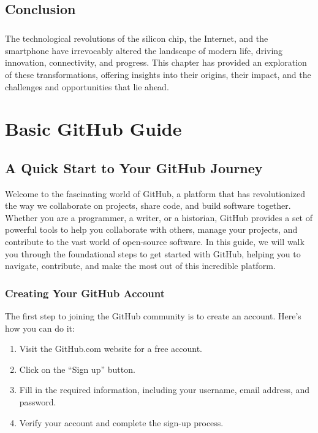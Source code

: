 \documentclass{book}
\begin{document}
\section*{Conclusion}
\paragraph{}
The technological revolutions of the silicon chip, the Internet, and the smartphone have irrevocably altered the landscape of modern life, driving innovation, connectivity, and progress. This chapter has provided an exploration of these transformations, offering insights into their origins, their impact, and the challenges and opportunities that lie ahead.



\clearpage
{}
\appendix
\renewcommand{\thechapter}{\Roman{chapter}} %

\chapter{Basic GitHub Guide}
\section*{A Quick Start to Your GitHub Journey}

Welcome to the fascinating world of GitHub, a platform that has revolutionized the way we collaborate on projects, share code, and build software together. Whether you are a programmer, a writer, or a historian, GitHub provides a set of powerful tools to help you collaborate with others, manage your projects, and contribute to the vast world of open-source software. In this guide, we will walk you through the foundational steps to get started with GitHub, helping you to navigate, contribute, and make the most out of this incredible platform.

\subsection*{Creating Your GitHub Account}

The first step to joining the GitHub community is to create an account. Here’s how you can do it:

\begin{enumerate}
    \item Visit the GitHub.com website for a free account.
    \item Click on the “Sign up” button.
    \item Fill in the required information, including your username, email address, and password.
    \item Verify your account and complete the sign-up process.
\end{enumerate}
\end{document}
